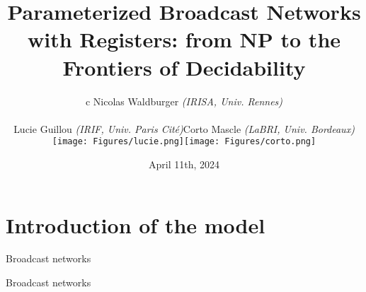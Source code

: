 \documentclass{beamer}
\begin{document}
	\title[Param. Broadcast Networks with
Registers]{Parameterized Broadcast Networks with
Registers: from NP to the Frontiers of
Decidability}
	\date[]{April 11th, 2024\vspace{-0.5cm}}
\author[Nicolas Waldburger]{\begin{tabular}{c} Nicolas Waldburger \textit{\scriptsize(IRISA, Univ. Rennes)} \\
		 \begin{tabular}{ccc}
		Lucie Guillou  \textit{\scriptsize(IRIF, Univ. Paris Cité)} & Corto Mascle  \textit{\scriptsize{(LaBRI, Univ. Bordeaux)}} \\
		\texttt{[image: Figures/lucie.png]} & \texttt{[image: Figures/corto.png]} 	\end{tabular} \end{tabular} \vspace{-0.3cm}}
%	
%	
\begin{frame} 	
	\titlepage
\end{frame}	


\section{Introduction of the model}


\begin{frame}{Broadcast networks}
	\centering
	
\end{frame}


\begin{frame}{Broadcast networks}
	\centering
	
\end{frame}
\end{document}
